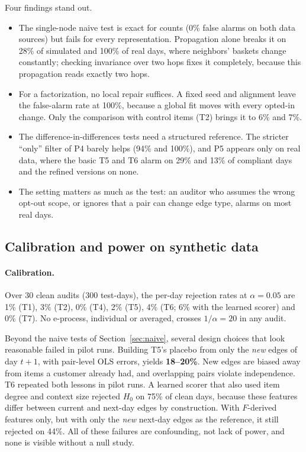 \documentclass[10pt,twocolumn,letterpaper]{article}
\theoremstyle{definition}
\begin{document}
Four findings stand out.
\begin{itemize}
  \item The single-node naive test is exact for counts (0\% false alarms on
        both data sources) but fails for every representation. Propagation
        alone breaks it on 28\% of simulated and 100\% of real days, where
        neighbors' baskets change constantly; checking invariance over two
        hops fixes it completely, because this propagation reads exactly two
        hops.
  \item For a factorization, no local repair suffices. A fixed seed and
        alignment leave the false-alarm rate at 100\%, because a global fit
        moves with every opted-in change. Only the comparison with control
        items (T2) brings it to 6\% and 7\%.
  \item The difference-in-differences tests need a structured reference. The
        stricter ``only'' filter of P4 barely helps (94\% and 100\%), and P5
        appears only on real data, where the basic T5 and T6 alarm on 29\% and
        13\% of compliant days and the refined versions on none.
  \item The setting matters as much as the test: an auditor who assumes the
        wrong opt-out scope, or ignores that a pair can change edge type,
        alarms on most real days.
\end{itemize}

\subsection{Calibration and power on synthetic data}\label{sec:synthres}
\paragraph{Calibration.}
Over 30 clean audits (300 test-days), the per-day rejection rates at $\alpha=0.05$
are 1\% (T1), 3\% (T2), 0\% (T4), 2\% (T5), 4\% (T6; 6\% with the learned scorer)
and 0\% (T7). No e-process, individual or averaged, crosses $1/\alpha=20$ in any
audit.

Beyond the naive tests of Section~\ref{sec:naive}, several design choices that
look reasonable failed in pilot runs. Building T5's placebo from only the \emph{new} edges of day $t{+}1$, with
pair-level OLS errors, yields \textbf{18--20\%}. New edges are biased away
from items a customer already had, and overlapping pairs violate independence.
T6 repeated both lessons in pilot runs. A learned scorer that also used item
degree and context size rejected $H_0$ on 75\% of clean days, because these
features differ between current and next-day edges by construction. With
$F$-derived features only, but with only the \emph{new} next-day edges as the
reference, it still rejected on 44\%. All of these failures are confounding,
not lack of power, and none is visible without a null study.
\end{document}
